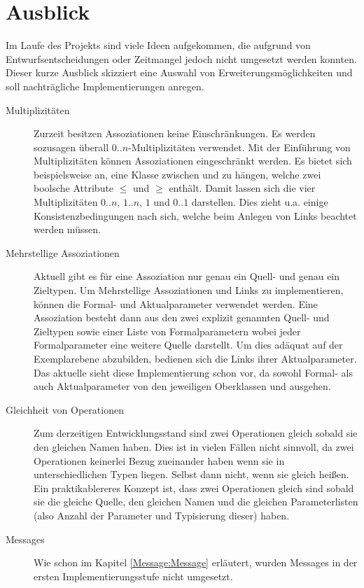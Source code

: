 \section{Ausblick}
Im Laufe des Projekts sind viele Ideen aufgekommen, die aufgrund von Entwurfsentscheidungen oder Zeitmangel 
jedoch nicht umgesetzt werden konnten. Dieser kurze Ausblick skizziert eine Auswahl von Erweiterungsmöglichkeiten und 
soll nachträgliche Implementierungen anregen.

\begin{description}
  \item[Multiplizitäten] Zurzeit besitzen Assoziationen keine Einschränkungen. 
Es werden sozusagen überall $0..n$-Multiplizitäten verwendet. 
Mit der Einführung von Multiplizitäten können Assoziationen eingeschränkt werden.
Es bietet sich beispielsweise an, eine Klasse  zwischen  und  zu hängen,
welche zwei boolsche Attribute $\leq$ und $\geq$ enthält. 
Damit lassen sich die vier Multiplizitäten $0..n$, $1..n$, $1$ und $0..1$ darstellen.
Dies zieht u.a. einige Konsistenzbedingungen nach sich, welche beim Anlegen von Links beachtet werden müssen. 
  \item[Mehrstellige Assoziationen] Aktuell gibt es für eine Assoziation nur genau ein Quell- und genau ein Zieltypen. 
  Um Mehrstellige Assoziationen und Links zu implementieren, können die Formal- und Aktualparameter verwendet werden. 
  Eine Assoziation besteht dann aus den zwei explizit genannten Quell- und Zieltypen sowie einer Liste von Formalparametern 
  wobei jeder Formalparameter eine weitere Quelle darstellt. Um dies adäquat auf der Exemplarebene abzubilden, 
  bedienen sich die Links ihrer Aktualparameter. Das aktuelle \MM sieht diese Implementierung schon vor, da sowohl 
  Formal- als auch Aktualparameter von den jeweiligen Oberklassen  und  ausgehen.
  \item[Gleichheit von Operationen] Zum derzeitigen Entwicklungsstand sind zwei Operationen gleich sobald sie den gleichen Namen haben. Dies ist in vielen Fällen nicht
  sinnvoll, da zwei Operationen keinerlei Bezug zueinander haben wenn sie in unterschiedlichen Typen liegen. Selbst dann nicht, wenn sie gleich heißen. 
  Ein praktikablereres Konzept ist, dass zwei Operationen gleich sind sobald sie die gleiche Quelle, den gleichen Namen und die gleichen Parameterlisten (also Anzahl der Parameter und Typisierung dieser) haben. 
  \item[Messages] Wie schon im Kapitel \ref{Message:Message} erläutert, wurden Messages in der ersten Implementierungsstufe nicht umgesetzt. 

\end{description}
